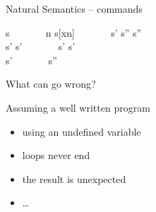 \documentclass[aspectratio=169]{beamer}
\begin{document}
\begin{slide}{Natural Semantics -- commands}
\small 
\centering
\newcommand{\msep}{~~~~~~}

%
  {\shrk}{ \leadsto s}
\msep %
%
  {\alert{\leadsto n}}%
  { \leadsto s[x\mapsto n]}
\msep %
%
  {\leadsto s' \quad {}\leadsto s''}%
  { \leadsto s''}
\\[5mm] %
%
  {\alert{\leadsto {}} \quad {}\leadsto s'}%
  { \leadsto s'}
\msep %
%
  {\alert{\leadsto {}} \quad {}\leadsto s'}%
  { \leadsto s'}
\\[5mm] %
%
  {\alert{\leadsto {}}}%
  { \leadsto s'}
\msep %
%
         { \leadsto s''}
\end{slide}



\begin{slide}{What can go wrong?}
  \begin{block}{Assuming a well written program}
    \begin{itemize}
      \item using an undefined variable
      \item loops never end
      \item the result is unexpected
      \item \ldots
    \end{itemize}
  \end{block}
\end{slide}
\end{document}
